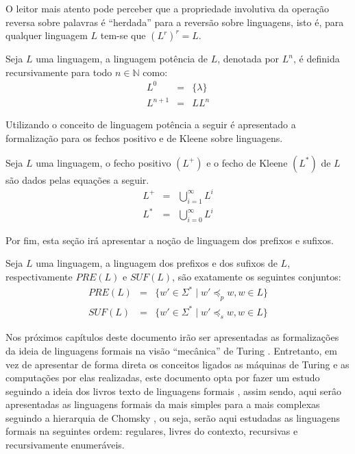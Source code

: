 O leitor mais atento pode perceber que a propriedade involutiva da operação reversa sobre palavras é ``herdada'' para a reversão sobre linguagens, isto é, para qualquer linguagem $L$ tem-se que $(L^r)^r = L$. 

\begin{definicao}
	Seja $L$ uma linguagem, a linguagem potência de $L$, denotada por $L^n$, é definida recursivamente para todo $n \in \mathbb{N}$ como:
	\begin{eqnarray}
		L^0 & = &\{\lambda\}\\
		L^{n+1} & = &  LL^{n}
	\end{eqnarray}
\end{definicao}

Utilizando o conceito de linguagem potência a seguir é apresentado a formalização para os fechos positivo e de Kleene sobre linguagens.

\begin{definicao}\label{def:FechoPositivoKleeneLinguagem}
	Seja $L$ uma linguagem, o fecho positivo $(L^+)$ e o fecho de Kleene $(L^*)$ de $L$ são dados pelas equações a seguir.
	\begin{eqnarray}
		L^+ & = & \bigcup_{i = 1}^\infty L^i\\
		L^* & = & \bigcup_{i = 0}^\infty L^i
	\end{eqnarray}
\end{definicao}

Por fim, esta seção irá apresentar a noção de linguagem dos prefixos e sufixos.

\begin{definicao}\label{def:LinguagemPrefixosSufixos}
	Seja $L$ uma linguagem, a linguagem dos prefixos e dos sufixos de $L$, respectivamente $PRE(L)$ e $SUF(L)$, são exatamente os seguintes conjuntos:
	\begin{eqnarray*}
		PRE(L) & = & \{w' \in \Sigma^* \mid w' \preceq_p w, w \in L\}\\
		SUF(L) & = & \{w' \in \Sigma^* \mid w' \preceq_s w, w \in L\}
	\end{eqnarray*}
\end{definicao}

Nos próximos capítulos deste documento irão ser apresentadas as formalizações da ideia de linguagens formais na visão ``mecânica'' de Turing \cite{turing1937}. Entretanto, em vez de apresentar de forma direta os conceitos ligados as máquinas de Turing e as computações por elas realizadas, este documento opta por fazer um estudo seguindo a ideia dos livros texto de linguagens formais \cite{benjaLivro2010, linz2006, menezes1998LFA}, assim sendo, aqui serâo apresentadas as linguagens formais da mais simples para a mais complexas seguindo a hierarquia de Chomsky \cite{chomsky1956}, ou seja, serão aqui estudadas as linguagens formais na seguintes ordem: regulares, livres do contexto, recursivas e recursivamente enumeráveis.

